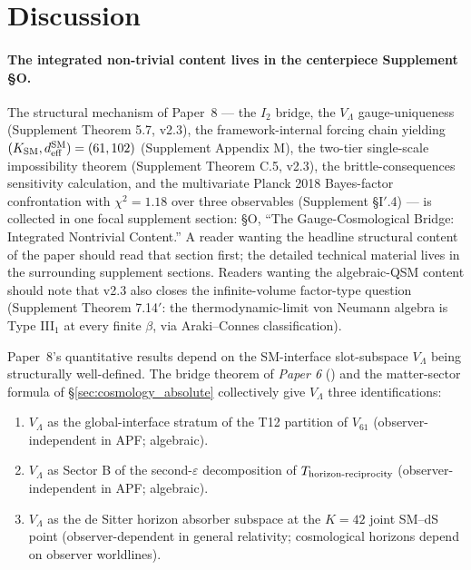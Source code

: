 \documentclass[11pt]{article}
\newcommand{\paperref}[2]{\emph{Paper #1} (\emph{#2})}
\begin{document}
\section{Discussion}\label{sec:discussion}

\paragraph{The integrated non-trivial content lives in the centerpiece Supplement \S O.}  The structural mechanism of Paper~8 --- the $I_2$ bridge, the $V_\Lambda$ gauge-uniqueness (Supplement Theorem 5.7, v2.3), the framework-internal forcing chain yielding $(K_{\rm SM}, d_{\rm eff}^{\rm SM}) = (61, 102)$ (Supplement Appendix M), the two-tier single-scale impossibility theorem (Supplement Theorem C.5, v2.3), the brittle-consequences sensitivity calculation, and the multivariate Planck 2018 Bayes-factor confrontation with $\chi^2 = 1.18$ over three observables (Supplement \S I$'$.4) --- is collected in one focal supplement section: \S O, ``The Gauge-Cosmological Bridge: Integrated Nontrivial Content.''  A reader wanting the headline structural content of the paper should read that section first; the detailed technical material lives in the surrounding supplement sections.  Readers wanting the algebraic-QSM content should note that v2.3 also closes the infinite-volume factor-type question (Supplement Theorem 7.14$'$: the thermodynamic-limit von Neumann algebra is Type III$_1$ at every finite $\beta$, via Araki--Connes classification).

\medskip

Paper~8's quantitative results depend on the SM-interface slot-subspace $V_\Lambda$ being structurally well-defined. The bridge theorem of \paperref{6}{} and the matter-sector formula of \S\ref{sec:cosmology_absolute} collectively give $V_\Lambda$ three identifications:

\begin{enumerate}[leftmargin=2em,itemsep=3pt]
    \item $V_\Lambda$ as the global-interface stratum of the T12 partition of $V_{61}$ (observer-independent in APF; algebraic).
    \item $V_\Lambda$ as Sector B of the second-$\varepsilon$ decomposition of $T_{\rm horizon\text{-}reciprocity}$ (observer-independent in APF; algebraic).
    \item $V_\Lambda$ as the de Sitter horizon absorber subspace at the $K = 42$ joint SM--dS point (observer-dependent in general relativity; cosmological horizons depend on observer worldlines).
\end{enumerate}
\end{document}
